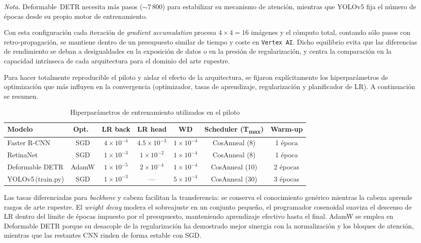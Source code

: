\noindent\small
\textit{Nota.} Deformable~DETR necesita más pasos (\(\sim 7\,800\)) para estabilizar su mecanismo de atención, mientras que YOLOv5 fija el número de épocas desde su propio motor de entrenamiento.

\noindent
Con esta configuración cada iteración de \textit{gradient accumulation} procesa \(4\times4=16\) imágenes y el cómputo total, contando sólo pasos con retro-propagación, se mantiene dentro de un presupuesto similar de tiempo y coste en \texttt{Vertex AI}.
Dicho equilibrio evita que las diferencias de rendimiento se deban a desigualdades en la exposición de datos o en la presión de regularización, y centra la comparación en la capacidad intrínseca de cada arquitectura para el dominio del arte rupestre.

Para hacer totalmente reproducible el piloto y aislar el efecto de la arquitectura, se fijaron explícitamente los hiperparámetros de optimización que más influyen en la convergencia (optimizador, tasas de aprendizaje, regularización y planificador de LR).  A continuación se resumen.

\begin{table}[h]
\centering
\caption{Hiperparámetros de entrenamiento utilizados en el piloto}
\label{tab:pilot_hparams}
\begin{tabular}{lcccccc}
\hline
\textbf{Modelo} & Opt.\ & LR back & LR head & WD & Scheduler (T\textsubscript{max}) & Warm-up \\
\hline
Faster R-CNN         & SGD   & $4\times10^{-4}$ & $4.5\times10^{-3}$ & $1\times10^{-4}$ & CosAnneal (8)  & 1 época \\
RetinaNet            & SGD   & $1\times10^{-3}$ & $1\times10^{-2}$   & $1\times10^{-4}$ & CosAnneal (8)  & 1 época \\
Deformable DETR      & AdamW & $1\times10^{-5}$ & $2\times10^{-4}$   & $1\times10^{-4}$ & CosAnneal (10) & 2 épocas \\
YOLOv5\,(train.py)   & SGD   & $1\times10^{-3}$ & —                 & $5\times10^{-4}$ & CosAnneal (30) & 3 épocas \\
\hline
\end{tabular}
\end{table}

\noindent
Las tasas diferenciadas para \textit{backbone} y cabeza facilitan la transferencia: se conserva el conocimiento genérico mientras la cabeza aprende rasgos de arte rupestre.
El \textit{weight decay} modera el sobreajuste en un conjunto pequeño, el programador cosenoidal suaviza el descenso de LR dentro del límite de épocas impuesto por el presupuesto, manteniendo aprendizaje efectivo hasta el final.
AdamW se emplea en Deformable DETR porque su desacople de la regularización ha demostrado mejor sinergia con la normalización y los bloques de atención, mientras que las restantes CNN rinden de forma estable con SGD.


